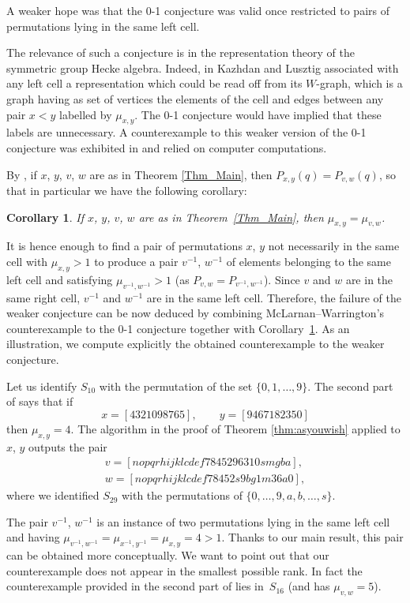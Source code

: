 \documentclass[pdftex]{sigma}
\numberwithin{equation}{section}
\newtheorem{Corollary}[Theorem]{Corollary}
\newcommand{\inv}{^{-1}}
\begin{document}
A weaker hope was that the 0-1 conjecture was valid once restricted to pairs of permutations lying in the same left cell.

The relevance of such a conjecture is in the representation theory of the symmetric group Hecke algebra. Indeed, in \cite{KL79} Kazhdan and Lusztig associated with any left cell a representation which could be read off from its $W$-graph, which is a graph having as set of vertices the elements of the cell and edges between any pair $x<y$ labelled by $\mu_{x,y}$. The 0-1 conjecture would have implied that these labels are unnecessary. A counterexample to this weaker version of the 0-1 conjecture was exhibited in \cite{mclarnanwarrington} and relied on computer computations.

By \cite[Corollary 6.3]{wooyong}, if $x$, $y$, $v$, $w$ are as in Theorem \ref{Thm_Main}, then $P_{x,y}(q)=P_{v,w}(q)$, so that in particular we have the following corollary:
\begin{Corollary}\label{Cor_01}
If $x$, $y$, $v$, $w$ are as in Theorem~{\rm \ref{Thm_Main}}, then $\mu_{x,y}=\mu_{v,w}$.
\end{Corollary}
It is hence enough to find a pair of permutations $x$, $y$ not necessarily in the same cell with $\mu_{x,y}>1$ to produce a pair $v^{-1}$, $w^{-1}$ of elements belonging to the same left cell and satisfying $\mu_{v^{-1},w^{-1}}>1$ (as $P_{v,w}=P_{v^{-1},w^{-1}}$).
Since $v$ and $w$ are in the same right cell, $v\inv$ and $w\inv$ are in the same left cell.
Therefore, the failure of the weaker conjecture can be now deduced by combining McLarnan--Warrington's counterexample to the 0-1 conjecture together with Corollary~\ref{Cor_01}. As an illustration, we compute explicitly the obtained counterexample to the weaker conjecture.

Let us identify $S_{10}$ with the permutation of the set $\{0,1,\dots, 9\}$. The second part of \cite[Theorem~1]{mclarnanwarrington} says that if
\[
x=[4321098765],\qquad y=[9467182350]
\]
then $\mu_{x,y}=4$.
The algorithm in the proof of Theorem \ref{thm:asyouwish} applied to $x$, $y$ outputs the pair
\begin{gather*}
 v=[nopqrhijklcdef7845296310smgba],\\
 w=[nopqrhijklcdef78452s9bg1m36a0],
\end{gather*}
where we identified $S_{29}$ with the permutations of $\{0,\dots, 9, a,b,\dots, s\}$.

The pair $v^{-1}$, $w^{-1}$ is an instance of two permutations lying in the same left cell and having $\mu_{v^{-1},w^{-1}}=\mu_{x^{-1},y^{-1}}=\mu_{x,y}=4>1$. Thanks to our main result, this pair can be obtained more conceptually. We want to point out that our counterexample does not appear in the smallest possible rank. In fact the counterexample provided in the second part of \cite[Theorem~1]{mclarnanwarrington} lies in~$S_{16}$ (and has $\mu_{v,w}=5$).
\end{document}
